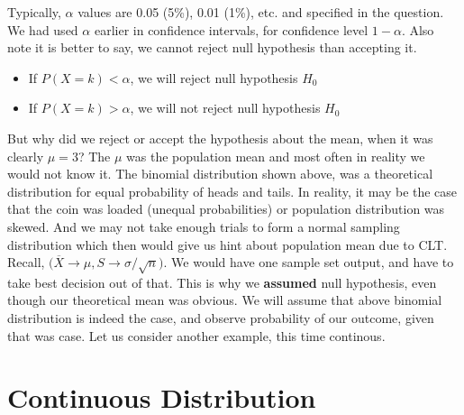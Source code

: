 \documentclass[float=false,crop=false]{standalone}
\begin{document}
Typically, \(\alpha\) values are 0.05 (5\%), 0.01 (1\%), etc. and
specified in the question. We had used \(\alpha\) earlier in confidence
intervals, for confidence level \(1-\alpha\). Also note it is better to
say, we cannot reject null hypothesis than accepting it.
\begin{tcolorbox}[colback=green!5,colframe=green!40!black,title=A basic hypothesis test]
\begin{itemize}
\item If $P(X=k) < \alpha$, we will reject null hypothesis $H_0$
\item If $P(X=k) > \alpha$, we will not reject null hypothesis $H_0$
\end{itemize}
\end{tcolorbox}
    But why did we reject or accept the hypothesis about the mean, when it
was clearly \(\mu=3\)? The \(\mu\) was the population mean and most
often in reality we would not know it. The binomial distribution shown
above, was a theoretical distribution for equal probability of heads and
tails. In reality, it may be the case that the coin was loaded (unequal
probabilities) or population distribution was skewed. And we may not
take enough trials to form a normal sampling distribution which then
would give us hint about population mean due to CLT. Recall,
\(\Big(\overline{X} \to \mu, S \to \sigma/\sqrt{n}\Big)\). We would have
one sample set output, and have to take best decision out of that. This
is why we \textbf{assumed} null hypothesis, even though our theoretical
mean was obvious. We will assume that above binomial distribution is
indeed the case, and observe probability of our outcome, given that was
case. Let us consider another example, this time continous.

    \section{Continuous Distribution}\label{continuous-distribution}
\end{document}
